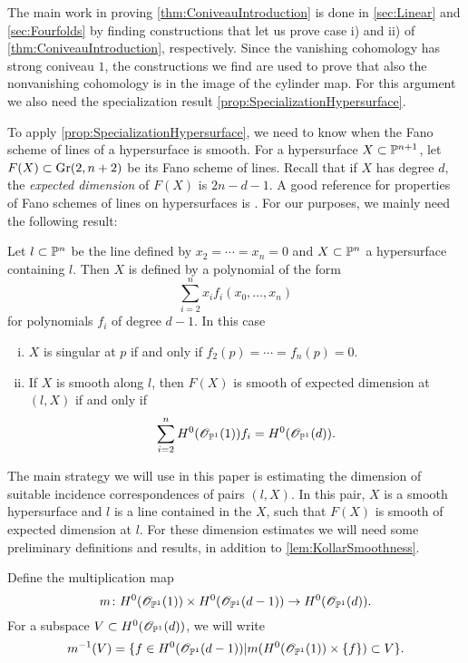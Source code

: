 The main work in proving \cref{thm:ConiveauIntroduction} is done in \cref{sec:Linear} and \cref{sec:Fourfolds} by finding constructions that let us prove case i) and ii) of \cref{thm:ConiveauIntroduction}, respectively. Since the vanishing cohomology has strong coniveau $1$, the constructions we find are used to prove that also the nonvanishing cohomology is in the image of the cylinder map. For this argument we also need the specialization result \cref{prop:SpecializationHypersurface}.

To apply \cref{prop:SpecializationHypersurface}, we need to know when the Fano scheme of lines of a hypersurface is smooth. For a hypersurface $X \subset \P^{n+1}$, let $F(X) \subset \Gr(2,n+2)$ be its Fano scheme of lines. Recall that if $X$ has degree $d$, the \emph{expected dimension} of $F(X)$ is $2n-d-1$. A good reference for properties of Fano schemes of lines on hypersurfaces is \cite[Section V.4]{KollarRationalCurves}. For our purposes, we mainly need the following result:
	\begin{lemma}
		\label{lem:KollarSmoothness}
		Let $l \subset \P^n$ be the line defined by ${x_2=\cdots=x_n=0}$ and $X \subset \P^n$ a hypersurface containing $l$. Then $X$ is defined by a polynomial of the form
		\[\sum_{i=2}^n x_i f_i(x_0,\dots,x_n) \]
		for polynomials $f_i$ of degree $d-1$. In this case
		\begin{enumerate}[i)]
			\item $X$ is singular at $p$ if and only if $f_2(p)= \cdots = f_n(p) = 0$.
			\item If $X$ is smooth along $l$, then $F(X)$ is smooth of expected dimension at $(l,X)$ if and only if
			\[
			\sum_{i=2}^{n}H^0(\sO_{\P^1}(1))f_i = H^0(\sO_{\P^1}(d)).
			\]
		\end{enumerate}
	\end{lemma}
	
The main strategy we will use in this paper is estimating the dimension of suitable incidence correspondences of pairs $(l,X)$. In this pair, $X$ is a smooth hypersurface and $l$ is a line contained in the $X$, such that $F(X)$ is smooth of expected dimension at $l$. For these dimension estimates we will need some preliminary definitions and results, in addition to \cref{lem:KollarSmoothness}.
	
	Define the multiplication map
	\[m \from H^0(\sO_{\P^1}(1)) \times H^0(\sO_{\P^1}(d-1)) \to H^0(\sO_{\P^1}(d)).\]
	For a subspace $V \subset H^0(\sO_{\P^1}(d))$, we will write
	\[ m^{-1}(V) = \set{f \in H^0(\sO_{\P^1}(d-1)) \vert m(H^0(\sO_{\P^1}(1)) \times \set{f}) \subset V }.\]
	
